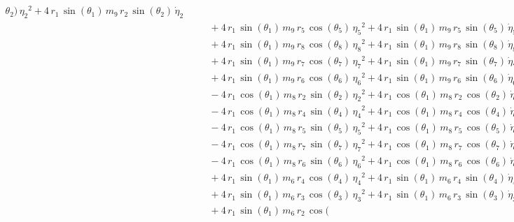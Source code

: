 \begin{eqnarray*}
{\theta_{2}})\,{{\eta_{2}}}^2 + 4\,r_{1}\,\sin({\theta_{1}})\,m_{9}\,r
_{2}\,\sin({\theta_{2}})\,{\dot{\eta}_{2}} \\ &&\quad\mbox{} + 4\,r_{1
}\,\sin({\theta_{1}})\,m_{9}\,r_{5}\,\cos({\theta_{5}})\,{{\eta_{5}}}^
2 + 4\,r_{1}\,\sin({\theta_{1}})\,m_{9}\,r_{5}\,\sin({\theta_{5}})\,{
\dot{\eta}_{5}} \\ &&\quad\mbox{} + 4\,r_{1}\,\sin({\theta_{1}})\,m_{9
}\,r_{8}\,\cos({\theta_{8}})\,{{\eta_{8}}}^2 + 4\,r_{1}\,\sin({\theta
_{1}})\,m_{9}\,r_{8}\,\sin({\theta_{8}})\,{\dot{\eta}_{8}}
 \\ &&\quad\mbox{} + 4\,r_{1}\,\sin({\theta_{1}})\,m_{9}\,r_{7}\,\cos(
{\theta_{7}})\,{{\eta_{7}}}^2 + 4\,r_{1}\,\sin({\theta_{1}})\,m_{9}\,r
_{7}\,\sin({\theta_{7}})\,{\dot{\eta}_{7}} \\ &&\quad\mbox{} + 4\,r_{1
}\,\sin({\theta_{1}})\,m_{9}\,r_{6}\,\cos({\theta_{6}})\,{{\eta_{6}}}^
2 + 4\,r_{1}\,\sin({\theta_{1}})\,m_{9}\,r_{6}\,\sin({\theta_{6}})\,{
\dot{\eta}_{6}} \\ &&\quad\mbox{} - 4\,r_{1}\,\cos({\theta_{1}})\,m_{8
}\,r_{2}\,\sin({\theta_{2}})\,{{\eta_{2}}}^2 + 4\,r_{1}\,\cos({\theta
_{1}})\,m_{8}\,r_{2}\,\cos({\theta_{2}})\,{\dot{\eta}_{2}}
 \\ &&\quad\mbox{} - 4\,r_{1}\,\cos({\theta_{1}})\,m_{8}\,r_{4}\,\sin(
{\theta_{4}})\,{{\eta_{4}}}^2 + 4\,r_{1}\,\cos({\theta_{1}})\,m_{8}\,r
_{4}\,\cos({\theta_{4}})\,{\dot{\eta}_{4}} \\ &&\quad\mbox{} - 4\,r_{1
}\,\cos({\theta_{1}})\,m_{8}\,r_{5}\,\sin({\theta_{5}})\,{{\eta_{5}}}^
2 + 4\,r_{1}\,\cos({\theta_{1}})\,m_{8}\,r_{5}\,\cos({\theta_{5}})\,{
\dot{\eta}_{5}} \\ &&\quad\mbox{} - 4\,r_{1}\,\cos({\theta_{1}})\,m_{8
}\,r_{7}\,\sin({\theta_{7}})\,{{\eta_{7}}}^2 + 4\,r_{1}\,\cos({\theta
_{1}})\,m_{8}\,r_{7}\,\cos({\theta_{7}})\,{\dot{\eta}_{7}}
 \\ &&\quad\mbox{} - 4\,r_{1}\,\cos({\theta_{1}})\,m_{8}\,r_{6}\,\sin(
{\theta_{6}})\,{{\eta_{6}}}^2 + 4\,r_{1}\,\cos({\theta_{1}})\,m_{8}\,r
_{6}\,\cos({\theta_{6}})\,{\dot{\eta}_{6}} \\ &&\quad\mbox{} + 4\,r_{1
}\,\sin({\theta_{1}})\,m_{6}\,r_{4}\,\cos({\theta_{4}})\,{{\eta_{4}}}^
2 + 4\,r_{1}\,\sin({\theta_{1}})\,m_{6}\,r_{4}\,\sin({\theta_{4}})\,{
\dot{\eta}_{4}} \\ &&\quad\mbox{} + 4\,r_{1}\,\sin({\theta_{1}})\,m_{6
}\,r_{3}\,\cos({\theta_{3}})\,{{\eta_{3}}}^2 + 4\,r_{1}\,\sin({\theta
_{1}})\,m_{6}\,r_{3}\,\sin({\theta_{3}})\,{\dot{\eta}_{3}}
 \\ &&\quad\mbox{} + 4\,r_{1}\,\sin({\theta_{1}})\,m_{6}\,r_{2}\,\cos(

\end{eqnarray*}
